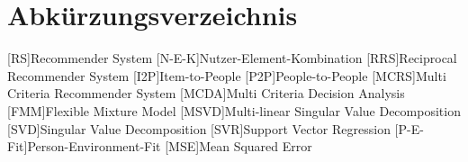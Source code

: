 \renewcommand{\chaptermark}[1]{\markboth{\spacedlowsmallcaps{#1}}{\spacedlowsmallcaps{#1}}}
\renewcommand{\sectionmark}[1]{\markright{\thesection\enspace\spacedlowsmallcaps{#1}}}
\chapter*{Abk\"{u}rzungsverzeichnis}

\begin{acronym}[AWGN]%
  [RS]{Recommender System}
  [N-E-K]{Nutzer-Element-Kombination}
  [RRS]{Reciprocal Recommender System}
  [I2P]{Item-to-People}
  [P2P]{People-to-People}
  [MCRS]{Multi Criteria Recommender System}
  [MCDA]{Multi Criteria Decision Analysis}
  [FMM]{Flexible Mixture Model}
  [MSVD]{Multi-linear Singular Value Decomposition}
  [SVD]{Singular Value Decomposition}
  [SVR]{Support Vector Regression}
  [P-E-Fit]{Person-Environment-Fit}
  [MSE]{Mean Squared Error}
\end{acronym}

\cleardoublepage
